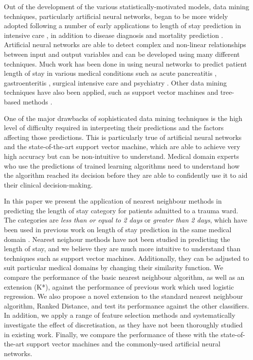 \documentclass{article}
\begin{document}
Out of the development of the various statistically-motivated models, data
mining techniques, particularly artificial neural networks,
began to be more widely adopted following a number of
early applications to length of stay prediction in intensive
care \citep{Tu1993,Dybowski1996}, in addition to disease diagnosis and mortality
prediction \citep{Silva2006}. Artificial neural networks are able to detect
complex and non-linear relationships between input and output variables and can
be developed using many different techniques. Much work has been done in using
neural networks to predict patient length of stay in various medical conditions
such as acute pancreatitis \citep{Walczak2003}, gastroenteritis \citep{Ng2006},
surgical intensive care \citep{Buchman1994,Tu1993} and
psychiatry \citep{Lowell1997}. Other data mining techniques have also been
applied, such as support vector machines and tree-based
methods \citep{Harper2005}.

One of the major drawbacks of sophisticated data mining techniques is the high
level of difficulty required in interpreting their predictions and the factors
affecting those predictions. This is
particularly true of artificial neural networks and the state-of-the-art
support vector machine, which are able to achieve very high accuracy but can be
non-intuitive to understand. Medical domain experts who use the predictions of
trained learning algorithms need to understand how the algorithm reached its
decision before they are able to confidently use it to aid their clinical
decision-making.

In this paper we present the application of nearest neighbour methods
in predicting the length of stay category for patients admitted to a trauma
ward. The categories are \textit{less than or equal to 2 days} or
\textit{greater than 2 days}, which have been used in previous work on length
of stay prediction in the same medical domain \citep{Dinh2013a}.
Nearest neighour methods have not been studied in predicting the length of stay,
and we believe they are much more intuitive to
understand than techniques such as support vector machines.
Additionally, they can be adjusted to suit particular medical domains by
changing their similarity function. We compare the performance of the basic
nearest neighbour algorithm, as well as an extension (K*), against the
performance
of previous work which used logistic regression. We also propose a novel
extension to the standard nearest neighbour algorithm, Ranked Distance, and
test its performance against the other classifiers. In addition, we apply a
range of feature selection methods and systematically investigate the effect
of discretisation, as they have not been
thoroughly studied in existing work. Finally, we compare the performance of
these with the state-of-the-art support vector machines and the
commonly-used artificial neural networks.
\end{document}
